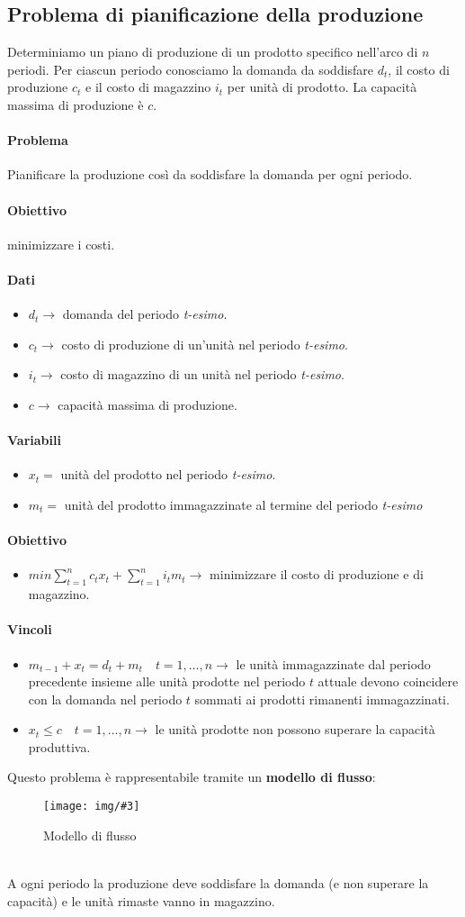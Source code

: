 \documentclass[12pt, twoside, letterpaper]{article}
\newcommand{\img}[3] {
	\begin{figure}[h]
		\caption*{#1}
		\centering
		\texttt{[image: img/\#3]}\\
	\end{figure}
}
\newcommand{\problemai}[5]{
	#1
	\begin{dati}
		\paragraph{Dati} 
			\begin{itemize}
				#2
			\end{itemize}
	\end{dati}
	\begin{variabili}
		\paragraph{Variabili} 
			\begin{itemize}
				#3
			\end{itemize}
	\end{variabili}
	\begin{obiettivo}
		\paragraph{Obiettivo} 
			\begin{itemize}
				#4
			\end{itemize}
	\end{obiettivo}
	\begin{vincoli}
		\paragraph{Vincoli}
			\begin{itemize}
				#5
			\end{itemize}
	\end{vincoli}
}
\begin{document}
		\subsection{Problema di pianificazione della produzione}
			\problemai{
				Determiniamo un piano di produzione di un prodotto specifico nell'arco di $n$ periodi. Per ciascun periodo conosciamo la domanda da soddisfare $d_t$, il costo di produzione $c_t$ e il costo di magazzino $i_t$ per unità di prodotto. La capacità massima di produzione è $c$.
				
				\paragraph{Problema} Pianificare la produzione così da soddisfare la domanda per ogni periodo.
				
				\paragraph{Obiettivo} minimizzare i costi.
			}{
				\item $d_t \rightarrow$ domanda del periodo \textit{t-esimo}.
				\item $c_t \rightarrow$ costo di produzione di un'unità nel periodo \textit{t-esimo}.
				\item $i_t \rightarrow$ costo di magazzino di un unità nel periodo \textit{t-esimo}.
				\item $c \rightarrow$ capacità massima di produzione.
			}{
				\item $x_t =$ unità del prodotto nel periodo \textit{t-esimo}.
				\item $m_t =$ unità del prodotto immagazzinate al termine del periodo \textit{t-esimo}
			}{
				\item $min \sum _{t=1}^n c_t x_t + \sum_{t=1}^n i_t m_t \rightarrow$ minimizzare il costo di produzione e di magazzino.
			}{
				\item $m_{t-1} + x_t = d_t + m_t \quad t = 1, \dots, n \rightarrow$ le unità immagazzinate dal periodo precedente insieme alle unità prodotte nel periodo $t$ attuale devono coincidere con la domanda nel periodo $t$ sommati ai prodotti rimanenti immagazzinati.
				\item $x_t \leq c \quad t = 1, \dots, n \rightarrow$ le unità prodotte non possono superare la capacità produttiva.
			}
			Questo problema è rappresentabile tramite un \textbf{modello di flusso}:
			\img{Modello di flusso}{0.7}{img1.png}
			\\A ogni periodo la produzione deve soddisfare la domanda (e non superare la capacità) e le unità rimaste vanno in magazzino.	
			
\end{document}
